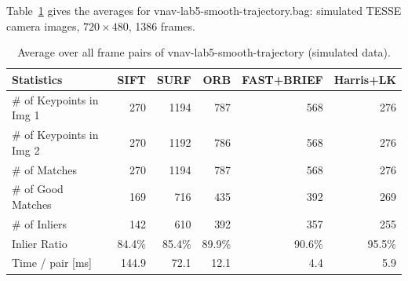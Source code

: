 \documentclass[11pt,a4paper]{article}
\newenvironment{keep}{\par\begin{lrbox}{\keepbox}\begin{minipage}{\linewidth}\setlength{\parskip}{0.4em}}{\end{minipage}\end{lrbox}%
  \noindent\usebox{\keepbox}\par}
\DeclareRobustCommand{\code}[1]{\begingroup\ttfamily\codebreaks#1\endgroup}
\newcommand{\codebreaks}{\renewcommand{\_}{\textunderscore\allowbreak}}
\begin{document}
\begin{keep}
Table~\ref{tab:smooth} gives the averages for \code{vnav-lab5-smooth-trajectory.bag}:
simulated TESSE camera images, $720\times480$, 1386 frames.

\begin{table}[H]
  \centering\small
  \caption{Average over all frame pairs of \code{vnav-lab5-smooth-trajectory} (simulated data).}
  \label{tab:smooth}
  \begin{tabular}{lrrrrr}
    \toprule
    Statistics & SIFT & SURF & ORB & FAST+BRIEF & Harris+LK \\
    \midrule
\# of Keypoints in Img 1 & 270 & 1194 & 787 & 568 & 276 \\
\# of Keypoints in Img 2 & 270 & 1192 & 786 & 568 & 276 \\
\# of Matches & 270 & 1194 & 787 & 568 & 276 \\
\# of Good Matches & 169 & 716 & 435 & 392 & 269 \\
\# of Inliers & 142 & 610 & 392 & 357 & 255 \\
Inlier Ratio & 84.4\% & 85.4\% & 89.9\% & 90.6\% & 95.5\% \\
Time / pair [ms] & 144.9 & 72.1 & 12.1 & 4.4 & 5.9 \\
    \bottomrule
  \end{tabular}
\end{table}
\end{keep}
\end{document}
